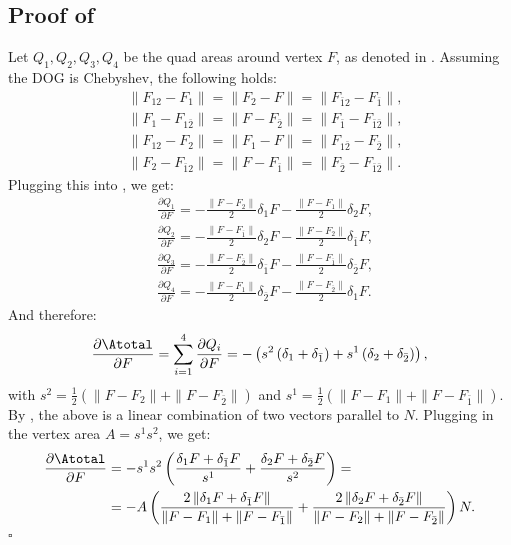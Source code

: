 \subsection{Proof of } \label{app:laplace_cheb_lemma_proof}
Let $Q_1,Q_2,Q_3,Q_4$ be the quad areas around vertex $F$, as denoted in .
Assuming the DOG is Chebyshev, the following holds:
\begin{equation} \label{eq:cheb}
\begin{split}
 &\|F_{12}-F_1\| = \|F_2-F\| = \|F_{\bar12}-F_{\bar1}\|, \\
 &\|F_1-F_{1 \bar2} \| = \|F-F_{\bar 2}\| = \|F_{\bar1}-F_{\bar1 \bar2}\|, \\
 &\|F_{12}-F_2\| = \|F_1-F\| = \|F_{1\bar2}-F_{\bar2}\|, \\
 &\|F_2-F_{\bar1 2} \| = \|F-F_{\bar 1}\| = \|F_{\bar2}-F_{\bar1 \bar2}\|.
\end{split}
\end{equation}
%
Plugging this into , we get:
\begin{equation}
\begin{split}
&\frac{\partial Q_1}{\partial F} = -\frac{\|F-F_2\|}{2}\delta_1F-\frac{\|F-F_1\|}{2}\delta_2F, \\
&\frac{\partial Q_2}{\partial F} = -\frac{\|F-F_{\bar 1}\|}{2}\delta_2F - \frac{\|F-F_2\|}{2}\delta_{\bar1}F, \\
&\frac{\partial Q_3}{\partial F} = -\frac{\|F-F_{\bar 2}\|}{2}\delta_{\bar1}F - \frac{\|F-F_{\bar 1}\|}{2}\delta_{\bar2}F, \\
&\frac{\partial Q_4}{\partial F} = -\frac{\|F-F_1\|}{2}\delta_{\bar2}F - \frac{\|F-F_{\bar 2}\|}{2}\delta_1F.
\end{split}
\end{equation}
And therefore:
\begin{equation}
\frac{\partial \Atotal}{\partial F} = \sum_{i=1}^4 \frac{\partial Q_i}{\partial F}=  -\left(s^2\left(\delta_1+\delta_{\bar1}\right) + s^1\left(\delta_2+\delta_{\bar2}\right)\right),
\end{equation}
with $s^2 = \frac{1}{2}\left( \| F-F_2 \|+\| F-F_{\bar2} \|\right)$ and $s^1 = \frac{1}{2}\left( \| F-F_1 \|+\| F-F_{\bar1} \|\right)$. By , the above is a linear combination of two vectors parallel to $N$. Plugging in the vertex area $A=s^1s^2$, we get:
\begin{align}
\frac{\partial \Atotal}{\partial F} &= -s^1s^2\left(\frac{\delta_1F+\delta_{\bar 1}F}{s^1}+\frac{\delta_2F+\delta_{\bar2}F}{s^2}\right)= \\
\nonumber
&= -A\left(\frac{2\,\|\delta_1F+\delta_{\bar 1}F\|}{\|F - F_1\|+\|F - F_{\bar 1}\|} + \frac{2\,\|\delta_2F+\delta_{\bar 2}F\|}{\|F - F_2\|+\|F - F_{\bar 2}\|}\right)N.
\end{align}
\hfill$\square$

